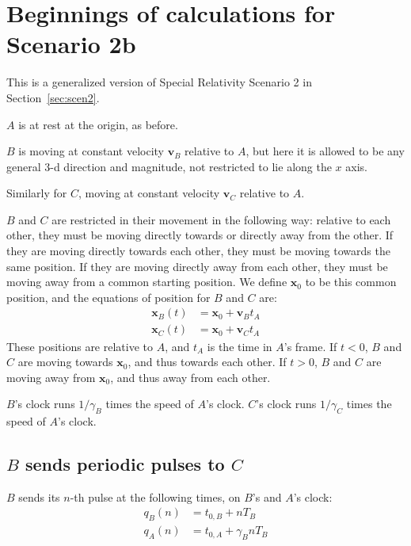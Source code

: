 \documentclass[a4paper]{article}
\theoremstyle{plain}
\theoremstyle{definition}
\newcommand{\vect}[1]{\mathbf{#1}}
\begin{document}
\section{Beginnings of calculations for Scenario 2b}
\label{app:scen2b}

This is a generalized version of Special Relativity Scenario 2 in
Section~\ref{sec:scen2}.

$A$ is at rest at the origin, as before.

$B$ is moving at constant velocity $\vect{v}_B$ relative to $A$, but
here it is allowed to be any general 3-d direction and magnitude, not
restricted to lie along the $x$ axis.

Similarly for $C$, moving at constant velocity $\vect{v}_C$ relative
to $A$.

$B$ and $C$ are restricted in their movement in the following way:
relative to each other, they must be moving directly towards or
directly away from the other.  If they are moving directly towards
each other, they must be moving towards the same position.  If they
are moving directly away from each other, they must be moving away
from a common starting position.  We define $\vect{x}_0$ to be this
common position, and the equations of position for $B$ and $C$ are:
\begin{align}
\vect{x}_B(t) & = \vect{x}_0 + \vect{v}_B t_A \label{eqn:scen2b-Bpos} \\
\vect{x}_C(t) & = \vect{x}_0 + \vect{v}_C t_A \label{eqn:scen2b-Cpos}
\end{align}
These positions are relative to $A$, and $t_A$ is the time in $A$'s
frame.  If $t < 0$, $B$ and $C$ are moving towards $\vect{x}_0$, and
thus towards each other.  If $t > 0$, $B$ and $C$ are moving away from
$\vect{x}_0$, and thus away from each other.

$B$'s clock runs $1/\gamma_B$ times the speed of $A$'s clock.
$C$'s clock runs $1/\gamma_C$ times the speed of $A$'s clock.


\subsection{$B$ sends periodic pulses to $C$}
\label{app:scen2b-Bsending}

$B$ sends its $n$-th pulse at the following times, on $B$'s and $A$'s
clock:
\begin{align}
q_B(n) & = t_{0,B} + nT_B \\
q_A(n) & = t_{0,A} + \gamma_B nT_B
\end{align}
\end{document}
